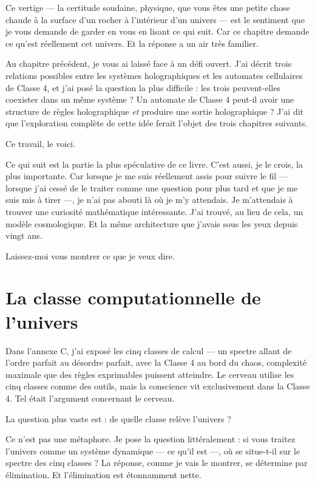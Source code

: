 \documentclass[11pt, twoside, openright]{book}
\begin{document}
Ce vertige --- la certitude soudaine, physique, que vous êtes une petite chose chaude à la surface d'un rocher à l'intérieur d'un univers --- est le sentiment que je vous demande de garder en vous en lisant ce qui suit. Car ce chapitre demande ce qu'est réellement cet univers. Et la réponse a un air très familier.


Au chapitre précédent, je vous ai laissé face à un défi ouvert. J'ai décrit trois relations possibles entre les systèmes holographiques et les automates cellulaires de Classe 4, et j'ai posé la question la plus difficile : les trois peuvent-elles coexister dans un même système ? Un automate de Classe 4 peut-il avoir une structure de règles holographique \textit{et} produire une sortie holographique ? J'ai dit que l'exploration complète de cette idée ferait l'objet des trois chapitres suivants.

Ce travail, le voici.

Ce qui suit est la partie la plus spéculative de ce livre. C'est aussi, je le crois, la plus importante. Car lorsque je me suis réellement assis pour suivre le fil --- lorsque j'ai cessé de le traiter comme une question pour plus tard et que je me suis mis à tirer ---, je n'ai pas abouti là où je m'y attendais. Je m'attendais à trouver une curiosité mathématique intéressante. J'ai trouvé, au lieu de cela, un modèle cosmologique. Et la même architecture que j'avais sous les yeux depuis vingt ans.

Laissez-moi vous montrer ce que je veux dire.


\section*{La classe computationnelle de l'univers}

Dans l'annexe C, j'ai exposé les cinq classes de calcul --- un spectre allant de l'ordre parfait au désordre parfait, avec la Classe 4 au bord du chaos, complexité maximale que des règles exprimables puissent atteindre. Le cerveau utilise les cinq classes comme des outils, mais la conscience vit exclusivement dans la Classe 4. Tel était l'argument concernant le cerveau.

La question plus vaste est : de quelle classe relève l'univers ?

Ce n'est pas une métaphore. Je pose la question littéralement : si vous traitez l'univers comme un système dynamique --- ce qu'il est ---, où se situe-t-il sur le spectre des cinq classes ? La réponse, comme je vais le montrer, se détermine par élimination. Et l'élimination est étonnamment nette.
\end{document}

